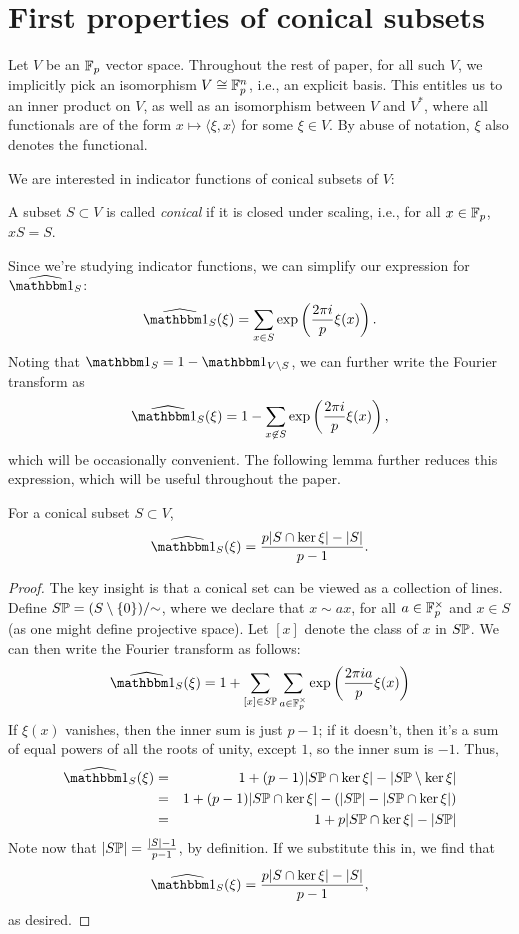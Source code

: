 \section{First properties of conical subsets}\label{sec:part0}

Let $V$ be an $\F_p$ vector space.
Throughout the rest of paper, for all such $V$, we implicitly pick an isomorphism 
	$V\cong\F_p^n$, i.e., an explicit basis. This
	entitles us to an inner product on $V$, as well as an isomorphism between $V$ and
	$V^*$, where all functionals are of the form $x \mapsto \langle \xi, x \rangle$
	for some $\xi\in V$. By abuse of notation, $\xi$ also denotes the functional.

We are interested in indicator functions of conical subsets of $V$:
\begin{defn}
    A subset $S\subset V$ is called \emph{conical} if it is closed under scaling,
    i.e., for all $x\in \F_p$, $xS = S$.    
\end{defn}
Since we're studying indicator functions, we can simplify our expression for 
$\widehat{\IND_S}$:
\[ \widehat{\IND_S}(\xi) = \sum_{x\in S} \exp \left(\frac{2\pi i}{p} \xi(x)\right). \]
Noting that $\IND_S = 1 - \IND_{V\setminus S}$, we can further write the Fourier transform as
\[ \widehat{\IND_S}(\xi) = 1 - \sum_{x\not\in S} \exp \left(\frac{2\pi i}{p} \xi(x)\right), \]
which will be occasionally convenient. The following lemma further reduces this expression,
which will be useful throughout the paper.
\begin{lem}\label{lem:FT-conical-subset}
	For a conical subset $S \subset V$,
	\[ \widehat{\IND_S}(\xi) = \frac{p|S \cap \ker \xi| - |S|}{p-1}. \]
	\begin{proof}
	   The key insight is that a conical set can be viewed as a collection of lines.
	   Define $S\P = (S\setminus\{0\}) / {\sim}$, where we declare that 
	   $x \sim a x$, for all $a\in\F_p^\times$ and
	   $x\in S$ (as one might define projective space). Let $[x]$ denote the class
	   of $x$ in $S\P$. We can then write the Fourier transform as follows:
	   \[ \widehat{\IND_S}(\xi) = 
	           1 + \sum_{[x]\in S\P} 
	               \sum_{a\in\F_p^\times} \exp \left(\frac{2\pi i a}{p} \xi(x)\right) \]
	   If $\xi(x)$ vanishes, then the inner sum is just $p-1$; if it doesn't, then it's
	   a sum of equal powers of all the roots of unity, except $1$, so the inner sum is $-1$.
	   Thus,
	   \begin{eqnarray*}
	       \widehat{\IND_S}(\xi)
	       &=& 1 + 
	           (p-1)|S\P \cap \ker \xi| - 
	           |S\P \setminus \ker\xi| \\
	       &=& 1 + 
	           (p-1)|S\P \cap \ker \xi| - 
	           (|S\P| - |S\P \cap \ker\xi|) \\
	       &=& 1 + 
	           p|S\P \cap \ker \xi| - |S\P|
	   \end{eqnarray*}
	   Note now that $|S\P| = \frac{|S| - 1}{p-1}$, by definition. If we substitute
	   this in, we find that 
	   \[ \widehat{\IND_S}(\xi) = \frac{p|S \cap \ker \xi| - |S|}{p-1}, \]
	   as desired.
	\end{proof}
\end{lem}

